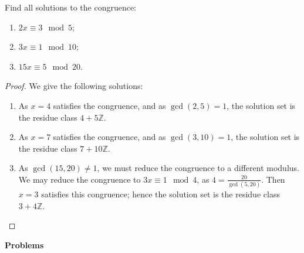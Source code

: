 \begin{prb}
Find all solutions to the congruence:
\begin{enumerate}
\item $2x\equiv3\mod{5}$;
\item $3x\equiv1\mod{10}$;
\item $15x\equiv5\mod{20}$.
\end{enumerate}
\begin{proof}
We give the following solutions:
\begin{enumerate}
\item As $x = 4$ satisfies the congruence, and as $\gcd{(2,5)} = 1$, the solution set is the residue class $4+5\mathbb{Z}$.
\item As $x = 7$ satisfies the congruence, and as $\gcd{(3,10)} = 1$, the solution set is the residue class $7+10\mathbb{Z}$.
\item As $\gcd{(15,20)} \neq 1$, we must reduce the congruence to a different modulus.  We may reduce the congruence to $3x\equiv1\mod{4}$, as $4 = \frac{20}{\gcd{(5,20)}}$.  Then $x = 3$ satisfies this congruence; hence the solution set is the residue class $3+4\mathbb{Z}$.
\end{enumerate}
\end{proof}
\end{prb}
\newpage

\begin{center}
\textbf{Problems}
\end{center}

